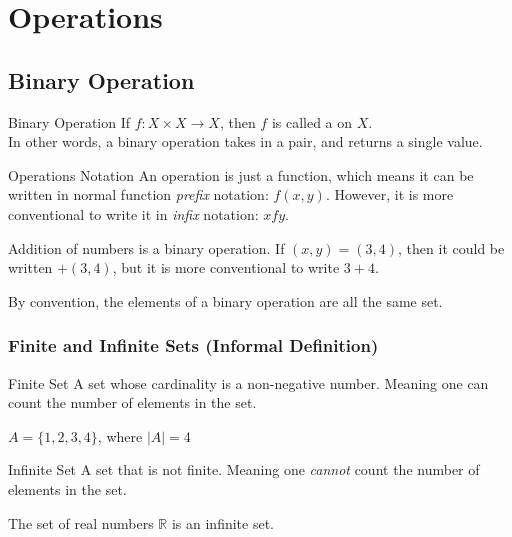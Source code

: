 \documentclass[\main/notes.tex]{subfiles}
\begin{document}
	\ifSubfilesClassLoaded{\setcounter{chapter}{7}}{}
	\chapter{Operations}
		\section{Binary Operation}
			\begin{definition}[width=0.9\textwidth]{Binary Operation}
				If $f: X \times X \rightarrow X$, then $f$ is called a  on $X$.\\
				In other words, a binary operation takes in a pair, and returns a single value.
			\end{definition}
			\begin{sidenote}{Operations Notation}
				An operation is just a function, which means it can be written in normal function \emph{prefix} notation: $f(x, y)$. However, it is more conventional to write it in \emph{infix} notation: $x f y$.
				\begin{example}
					Addition of numbers is a binary operation. If $(x, y) = (3, 4)$, then it could be written $+(3, 4)$, but it is more conventional to write $3 + 4$.
				\end{example}
			\end{sidenote}
			By convention, the elements of a binary operation are all the same set.
			\subsection[Finite and Infinite Sets]{Finite and Infinite Sets (Informal Definition)}
				\begin{definition}[width=0.8\textwidth]{Finite Set}
					A set whose cardinality is a non-negative number. Meaning one can count the number of elements in the set.\par
					\begin{example}[hbox]
						$A = \{1, 2, 3, 4\}$, where $\left\lvert A\right\rvert = 4$
					\end{example}
				\end{definition}
				\begin{definition}[width=0.8\textwidth]{Infinite Set}
					A set that is not finite. Meaning one \emph{cannot} count the number of elements in the set.\par
					\begin{example}[hbox]
						The set of real numbers $\mathbb{R}$ is an infinite set.
					\end{example}
				\end{definition}
			\pagebreak
\end{document}
